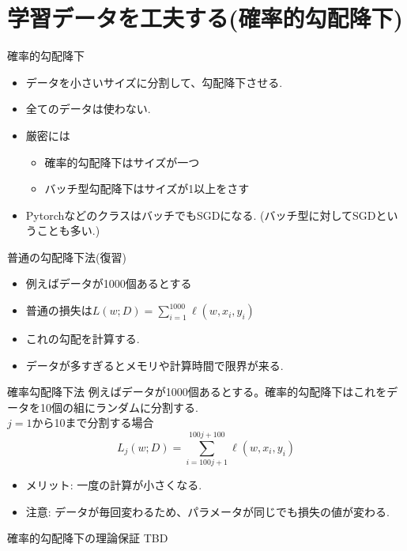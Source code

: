 \section{学習データを工夫する(確率的勾配降下)}
\begin{frame}[fragile]{確率的勾配降下}
\begin{itemize}
\item データを小さいサイズに分割して、勾配降下させる.
\item 全てのデータは使わない.
\item 厳密には
  \begin{itemize}
  \item 確率的勾配降下はサイズが一つ
  \item バッチ型勾配降下はサイズが1以上をさす
  \end{itemize}
\item PytorchなどのクラスはバッチでもSGDになる.
  (バッチ型に対してSGDということも多い.)
\end{itemize}
\end{frame}


\begin{frame}[fragile]{普通の勾配降下法(復習)}
\begin{itemize}
\item 例えばデータが1000個あるとする
\item 普通の損失は$L(w;D)  = \sum_{i = 1}^{1000} \ell(w, x_i, y_i)$
\item これの勾配を計算する.
\item データが多すぎるとメモリや計算時間で限界が来る.
\end{itemize}
\end{frame}


\begin{frame}[fragile]{確率勾配降下法}
例えばデータが1000個あるとする。確率的勾配降下はこれをデータを10個の組にランダムに分割する. \\
$j=1$から10まで分割する場合
\begin{equation*}
  L_j(w;D)  = \sum_{i = 100j +1}^{100j + 100} \ell(w, x_i, y_i)
\end{equation*}
\begin{itemize}
\item  メリット: 一度の計算が小さくなる.
\item 注意: データが毎回変わるため、パラメータが同じでも損失の値が変わる.
\end{itemize}
\end{frame}


\begin{frame}[fragile]{確率的勾配降下の理論保証}
  TBD
\end{frame}

